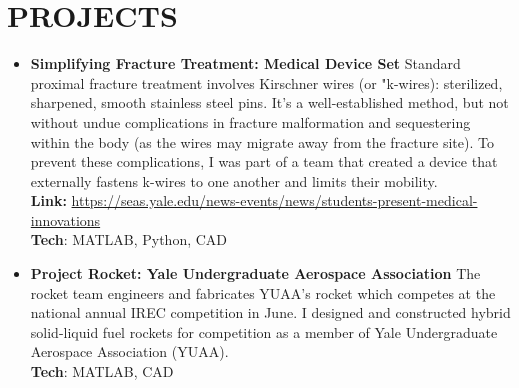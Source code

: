 \documentclass[a4paper,20pt]{article}
\newcommand{\resumeItem}[2]{
  \item\small{
    \textbf{#1}{#2 \vspace{-3pt}}
  }
}
\newcommand{\resumeSubItem}[2]{\resumeItem{#1}{#2}\vspace{-5pt}}
\newcommand{\resumeSubHeadingListStart}{\begin{itemize}[leftmargin=*]}
\newcommand{\resumeSubHeadingListEnd}{\end{itemize}}
\begin{document}
\section{\textbf{PROJECTS}}
\resumeSubHeadingListStart
\vspace{4pt}
\resumeSubItem{Simplifying Fracture Treatment: Medical Device Set }{ Standard proximal fracture treatment involves Kirschner wires (or "k-wires): sterilized, sharpened, smooth stainless steel pins. It's a well-established method, but not without undue complications in fracture malformation and sequestering within the body (as the wires may migrate away from the fracture site). To prevent these complications, I was part of a team that created a device that externally fastens k-wires to one another and limits their mobility. \\\textbf{Link: }\href{https://seas.yale.edu/news-events/news/students-present-medical-innovations}{https://seas.yale.edu/news-events/news/students-present-medical-innovations} 
\\\vspace{2pt}\textbf{Tech}: MATLAB, Python, CAD}
\vspace{5pt}
\resumeSubItem{Project Rocket: Yale Undergraduate Aerospace Association }{ The rocket team engineers and fabricates YUAA's rocket which competes at the national annual IREC competition in June. I designed and constructed hybrid solid-liquid fuel rockets for competition as a member of Yale Undergraduate Aerospace Association (YUAA). 
\\\vspace{2pt}\textbf{Tech}: MATLAB, CAD}
\resumeSubHeadingListEnd
\end{document}
